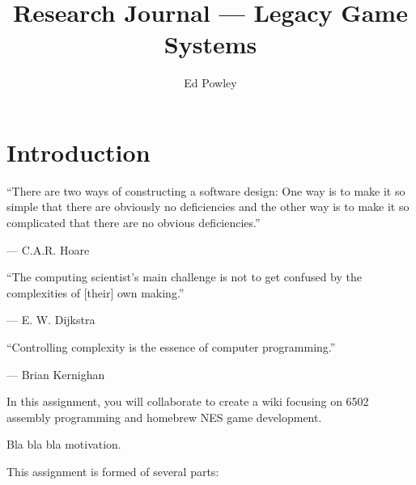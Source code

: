 \documentclass{../../fal_assignment}
\title{Research Journal --- Legacy Game Systems}
\author{Ed Powley}
\begin{document}
\maketitle

\section*{Introduction}

\begin{marginquote}
  ``There are two ways of constructing a software design: One way is to make it so simple that there are obviously no deficiencies and the other way is to make it so complicated that there are no obvious deficiencies.''
    
    --- C.A.R. Hoare
    
    \marginquoterule
    
    ``The computing scientist's main challenge is not to get confused by the complexities of [their] own making.''
    
    --- E. W. Dijkstra
    
    \marginquoterule

        ``Controlling complexity is the essence of computer programming.''
    
    --- Brian Kernighan
            
\end{marginquote}

In this assignment, you will collaborate to create a wiki focusing on 6502 assembly programming and homebrew NES game development.

Bla bla bla motivation.

This assignment is formed of several parts:
\end{document}

